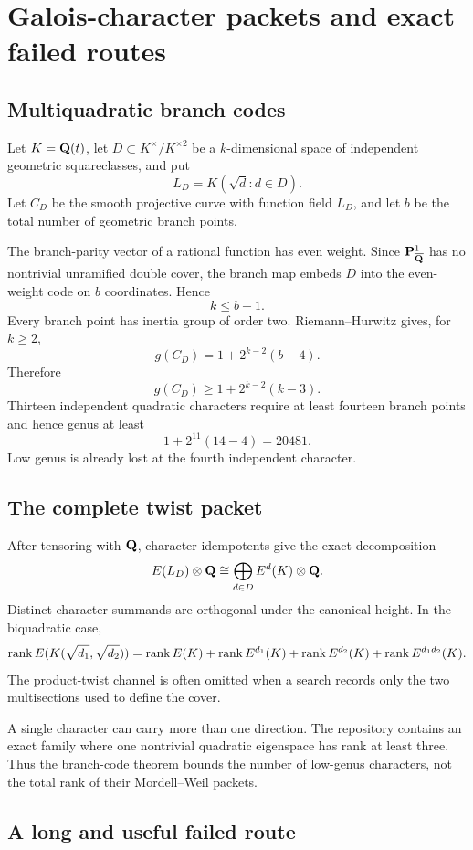 \section{Galois-character packets and exact failed routes}

\subsection{Multiquadratic branch codes}

Let $K=\mathbf Q(t)$, let $D\subset K^\times/K^{\times2}$ be a $k$-dimensional
space of independent geometric squareclasses, and put
\[
L_D=K(\sqrt d:d\in D).
\]
Let $C_D$ be the smooth projective curve with function field $L_D$, and let
$b$ be the total number of geometric branch points.

The branch-parity vector of a rational function has even weight.  Since
$\mathbf P^1_{\overline{\mathbf Q}}$ has no nontrivial unramified double cover, the
branch map embeds $D$ into the even-weight code on $b$ coordinates.  Hence
\[
\boxed{k\le b-1.}
\]
Every branch point has inertia group of order two.  Riemann--Hurwitz gives,
for $k\ge2$,
\[
\boxed{g(C_D)=1+2^{k-2}(b-4).}
\]
Therefore
\[
g(C_D)\ge1+2^{k-2}(k-3).
\]
Thirteen independent quadratic characters require at least fourteen branch
points and hence genus at least
\[
1+2^{11}(14-4)=20481.
\]
Low genus is already lost at the fourth independent character.

\subsection{The complete twist packet}

After tensoring with $\mathbf Q$, character idempotents give the exact decomposition
\[
E(L_D)\otimes\mathbf Q
\cong
\bigoplus_{d\in D}E^d(K)\otimes\mathbf Q.
\]
Distinct character summands are orthogonal under the canonical height.  In the
biquadratic case,
\[
\operatorname{rank} E(K(\sqrt{d_1},\sqrt{d_2}))
=
\operatorname{rank} E(K)+\operatorname{rank} E^{d_1}(K)+\operatorname{rank} E^{d_2}(K)+\operatorname{rank} E^{d_1d_2}(K).
\]
The product-twist channel is often omitted when a search records only the two
multisections used to define the cover.

A single character can carry more than one direction.  The repository
contains an exact family where one nontrivial quadratic eigenspace has rank at
least three.  Thus the branch-code theorem bounds the number of low-genus
characters, not the total rank of their Mordell--Weil packets.

\subsection{A long and useful failed route}

